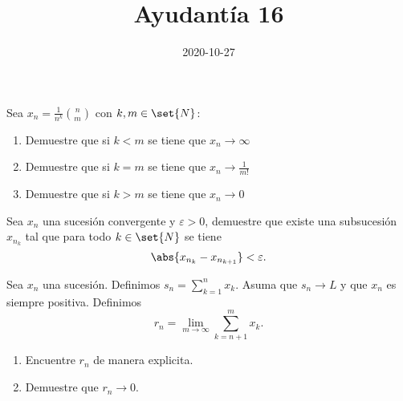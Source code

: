 \documentclass{ayudantia}
\title{Ayudantía 16}
\date{2020-10-27}
\begin{document}
\maketitle



\begin{prob}
    Sea \(x_n=\frac1{n^k}\binom{n}{m}\) con \(k,m\in\set{N}\):
    \begin{enumerate}[label=(\alph*)]
        \item Demuestre que si \(k<m\) se tiene que \(x_n\rightarrow\infty\)
        \item Demuestre que si \(k=m\) se tiene que \(x_n\rightarrow\frac1{m!}\)
        \item Demuestre que si \(k>m\) se tiene que \(x_n\rightarrow0\)
    \end{enumerate}
\end{prob}

\begin{ans}
    \begin{sol}

    \end{sol}
\end{ans}



\begin{prob}
    Sea \(x_n\) una sucesión convergente y \(\varepsilon>0\), demuestre que existe una subsucesión \(x_{n_k}\) tal que para todo \(k\in\set{N}\) se tiene
    \begin{equation*}
        \abs{x_{n_k}-x_{n_{k+1}}}<\varepsilon.
    \end{equation*}
\end{prob}

\begin{ans}
    \begin{sol}

    \end{sol}
\end{ans}

\begin{prob}
    Sea \(x_n\) una sucesión. Definimos \(s_n=\sum_{k=1}^nx_k\). Asuma que \(s_n\rightarrow L\) y que \(x_n\) es siempre positiva. Definimos
    \begin{equation*}
        r_n=\lim_{m\rightarrow\infty}\sum_{k=n+1}^mx_k.
    \end{equation*}
    \begin{enumerate}[label=(\alph*)]
        \item Encuentre \(r_n\) de manera explicita.
        \item Demuestre que \(r_n\rightarrow 0\).
    \end{enumerate}
\end{prob}

\begin{ans}
    \begin{sol}

    \end{sol}
\end{ans}
\end{document}
